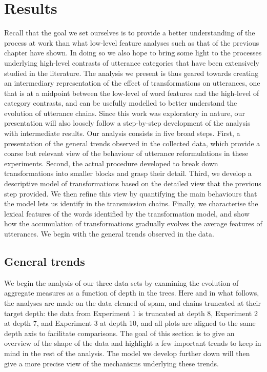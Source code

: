 \section{Results}\label{sec:gistr-results}

Recall that the goal we set ourselves is to provide a better
understanding of the process at work than what low-level feature
analyses such as that of the previous chapter have shown. In doing so we
also hope to bring some light to the processes underlying high-level
contrasts of utterance categories that have been extensively studied in
the literature. The analysis we present is thus geared towards creating
an intermediary representation of the effect of transformations on
utterances, one that is at a midpoint between the low-level of word
features and the high-level of category contrasts, and can be usefully
modelled to better understand the evolution of utterance chains. Since
this work was exploratory in nature, our presentation will also loosely
follow a step-by-step development of the analysis with intermediate
results. Our analysis consists in five broad steps. First, a
presentation of the general trends observed in the collected data, which
provide a coarse but relevant view of the behaviour of utterance
reformulations in these experiments. Second, the actual procedure
developed to break down transformations into smaller blocks and grasp
their detail. Third, we develop a descriptive model of transformations
based on the detailed view that the previous step provided. We then
refine this view by quantifying the main behaviours that the model lets
us identify in the transmission chains. Finally, we characterise the
lexical features of the words identified by the transformation model,
and show how the accumulation of transformations gradually evolves the
average features of utterances. We begin with the general trends
observed in the data.

\subsection{General trends}\label{sec:gistr-results-general}

We begin the analysis of our three data sets by examining the evolution
of aggregate measures as a function of depth in the trees. Here and in
what follows, the analyses are made on the data cleaned of spam, and
chains truncated at their target depth: the data from Experiment 1 is
truncated at depth 8, Experiment 2 at depth 7, and Experiment 3 at depth
10, and all plots are aligned to the same depth axis to facilitate
comparisons. The goal of this section is to give an overview of the
shape of the data and highlight a few important trends to keep in mind
in the rest of the analysis. The model we develop further down will then
give a more precise view of the mechanisms underlying these trends.

